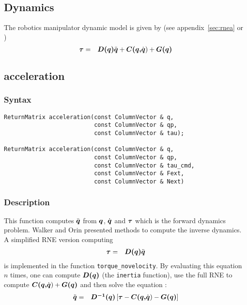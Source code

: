 \documentclass[11pt,fleqn,letterpaper]{report}
\newcommand{\mbold}[1]{\mbox{\boldmath $ #1 $}}
\begin{document}
\newpage

\subsection{Dynamics}

The robotics manipulator dynamic model is given by (see
appendix~\ref{sec:rnea} or \cite{craig})
\begin{eqnarray}
\mbold{\tau} & = & \mbold{D(q)} \ddot{\mbold{q}} + \mbold{C(q,}\dot{\mbold{q}}) 
+ \mbold{G(q)}
\end{eqnarray}

\subsection*{acceleration}
\subsubsection*{Syntax}
\begin{verbatim}
ReturnMatrix acceleration(const ColumnVector & q, 
                          const ColumnVector & qp,
                          const ColumnVector & tau);

ReturnMatrix acceleration(const ColumnVector & q, 
                          const ColumnVector & qp,
                          const ColumnVector & tau_cmd, 
                          const ColumnVector & Fext,
                          const ColumnVector & Next)
\end{verbatim}
\subsubsection*{Description}
This function computes $\ddot{\mbold{q}}$ from $\mbold{q}$, $\dot{\mbold{q}}$ and $\mbold{\tau}$ 
which is the forward dynamics problem.
Walker and Orin \cite{Walker82} presented methods to compute the inverse dynamics. 
A simplified RNE version computing 
\begin{eqnarray}
\mbold{\tau} & = & \mbold{D(q)} \ddot{\mbold{q}}
\end{eqnarray}
is implemented in the function {\tt torque\_novelocity}. By evaluating this equation $n$ times, 
one can compute $\mbold{D(q)}$ (the {\tt inertia} function), use the full RNE to compute
$\mbold{C(q,}\dot{\mbold{q}}) + \mbold{G(q)}$ and then solve the equation : 
\begin{eqnarray}
\ddot{\mbold{q}} & = & \mbold{D^{-1}(q)} \left [ \mbold{\tau} - \mbold{C(q,}\dot{\mbold{q}}) 
- \mbold{G(q)} \right ]
\end{eqnarray}
\end{document}
